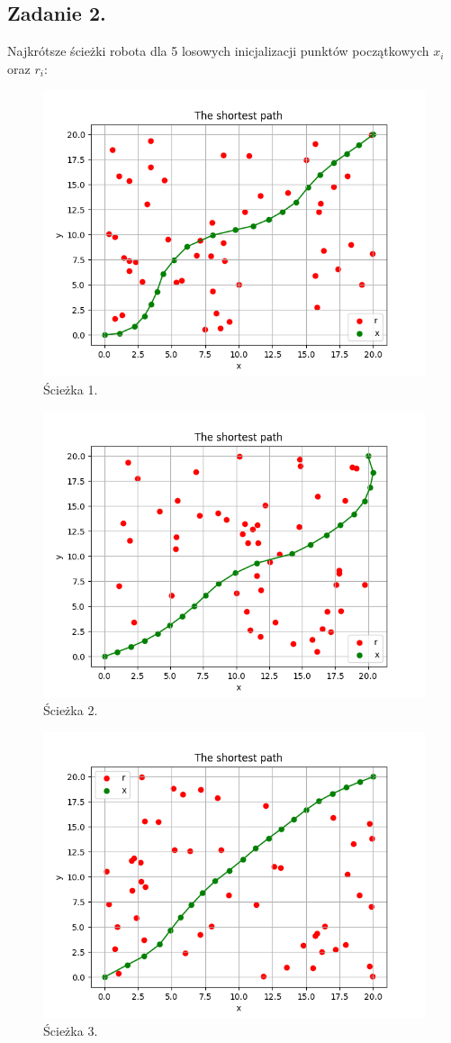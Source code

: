 \documentclass[11pt, leqno]{scrartcl}
\begin{document}
    \subsection{Zadanie 2.}
    Najkrótsze ścieżki robota dla 5 losowych inicjalizacji punktów
    początkowych $x_i$ oraz $r_i$:
    \begin{figure}[H]
        \centering
        \includegraphics[width=0.7\linewidth]{path1.png}
        \caption{Ścieżka 1.}
    \end{figure}
    \begin{figure}[H]
        \centering
        \includegraphics[width=0.7\linewidth]{path2.png}
        \caption{Ścieżka 2.}
    \end{figure}
    \begin{figure}[H]
        \centering
        \includegraphics[width=0.7\linewidth]{path3.png}
        \caption{Ścieżka 3.}
    \end{figure}
\end{document}
